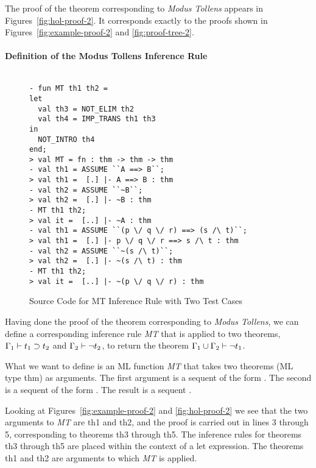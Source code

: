 The proof of the theorem corresponding to \emph{Modus Tollens} appears
in Figures~\ref{fig:hol-proof-2}. It corresponds exactly to the proofs
shown in Figures~\ref{fig:example-proof-2} and \ref{fig:proof-tree-2}.

\paragraph*{Definition of the Modus Tollens Inference Rule}
\label{sec:mt-inference-rule}

\begin{figure}[t]
  \centering
  \begin{small}
    \begin{session}
\begin{verbatim}

- fun MT th1 th2 =
let 
  val th3 = NOT_ELIM th2
  val th4 = IMP_TRANS th1 th3
in
  NOT_INTRO th4
end;
> val MT = fn : thm -> thm -> thm
- val th1 = ASSUME ``A ==> B``;
> val th1 =  [.] |- A ==> B : thm
- val th2 = ASSUME ``~B``;
> val th2 =  [.] |- ~B : thm
- MT th1 th2;
> val it =  [..] |- ~A : thm
- val th1 = ASSUME ``(p \/ q \/ r) ==> (s /\ t)``;
> val th1 =  [.] |- p \/ q \/ r ==> s /\ t : thm
- val th2 = ASSUME ``~(s /\ t)``;
> val th2 =  [.] |- ~(s /\ t) : thm
- MT th1 th2;
> val it =  [..] |- ~(p \/ q \/ r) : thm
\end{verbatim}
    \end{session}
  \end{small}
  \caption{Source Code for MT Inference Rule with Two Test Cases}
  \label{fig:mt-code}
\end{figure}

Having done the proof of the theorem corresponding to \emph{Modus
  Tollens}, we can define a corresponding inference rule \emph{MT}
that is applied to two theorems, $\Gamma_1 \vdash {t_1 \supset t_2}$
and $\Gamma_2 \vdash {\neg t_2}$, to return the theorem $\Gamma_1
  \cup \Gamma_2 \vdash {\neg t_1}$.

What we want to define is an ML function \emph{MT} that takes two
theorems (ML type thm) as arguments.  The first argument is a sequent
of the form .  The second is a
sequent of the form .  The result is a
sequent .

Looking at Figures~\ref{fig:example-proof-2} and \ref{fig:hol-proof-2}
we see that the two arguments to \emph{MT} are th1 and th2, and the
proof is carried out in lines 3 through 5, corresponding to theorems
th3 through th5. The inference rules for theorems th3 through th5 are
placed within the context of a let expression.  The theorems th1 and
th2 are arguments to which \emph{MT} is applied.

